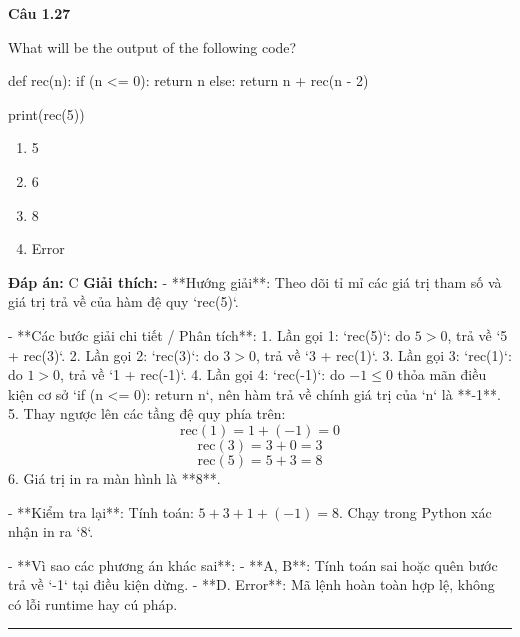 \documentclass[11pt,a4paper]{article}
\newenvironment{question}[1]{%
  \par\vspace{1em}\noindent\textbf{\large Câu #1}\par\vspace{0.4em}
}{%
  \par\vspace{1em}\hrule\vspace{0.6em}
}
\newenvironment{choices}{%
  \begin{enumerate}[label=\textbf{\Alph*.},leftmargin=2.2em,itemsep=2pt,topsep=3pt]
}{%
  \end{enumerate}
}
\newcommand{\choice}{\item}
\newenvironment{codebox}{%
  \begin{tcolorbox}[colback=gray!8!white,colframe=gray!50!black,arc=1.5mm,boxrule=0.6pt,left=3mm,right=3mm,top=2.5mm,bottom=2.5mm]
  \ttfamily\small
}{%
  \end{tcolorbox}
}
\begin{document}
\begin{question}{1.27}
What will be the output of the following code?
\begin{codebox}
def rec(n):
    if (n <= 0):
        return n
    else:
        return n + rec(n - 2)

print(rec(5))
\end{codebox}
\begin{choices}
\choice 5
\choice 6
\choice 8
\choice Error
\end{choices}
\textbf{Đáp án:} C
\textbf{Giải thích:} - **Hướng giải**:
  Theo dõi tỉ mỉ các giá trị tham số và giá trị trả về của hàm đệ quy `rec(5)`.

- **Các bước giải chi tiết / Phân tích**:
  1. Lần gọi 1: `rec(5)`: do \(5 > 0\), trả về `5 + rec(3)`.
  2. Lần gọi 2: `rec(3)`: do \(3 > 0\), trả về `3 + rec(1)`.
  3. Lần gọi 3: `rec(1)`: do \(1 > 0\), trả về `1 + rec(-1)`.
  4. Lần gọi 4: `rec(-1)`: do \(-1 \le 0\) thỏa mãn điều kiện cơ sở `if (n <= 0): return n`, nên hàm trả về chính giá trị của `n` là **-1**.
  5. Thay ngược lên các tầng đệ quy phía trên:
     \[
     \text{rec}(1) = 1 + (-1) = 0
     \]
     \[
     \text{rec}(3) = 3 + 0 = 3
     \]
     \[
     \text{rec}(5) = 5 + 3 = 8
     \]
  6. Giá trị in ra màn hình là **8**.

- **Kiểm tra lại**:
  Tính toán: \(5 + 3 + 1 + (-1) = 8\). Chạy trong Python xác nhận in ra `8`.

- **Vì sao các phương án khác sai**:
  - **A, B**: Tính toán sai hoặc quên bước trả về `-1` tại điều kiện dừng.
  - **D. Error**: Mã lệnh hoàn toàn hợp lệ, không có lỗi runtime hay cú pháp.
\end{question}
\end{document}
